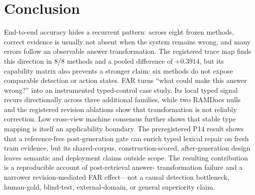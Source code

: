 \documentclass[letterpaper]{article}
\begin{document}
\section{Conclusion}
End-to-end accuracy hides a recurrent pattern: across eight frozen methods,
correct evidence is usually not absent when the system remains wrong, and many
errors follow an observable answer transformation. The registered trace map
finds this direction in 8/8 methods and a pooled difference of $+0.3914$, but
its capability matrix also prevents a stronger claim: six methods do not expose
comparable detection or action states. FAR turns ``what could make this answer
wrong?'' into an instrumented typed-control case study. Its local typed signal
recurs directionally across three additional families, while two RAMDocs nulls
and the registered revision ablations show that transformation is not reliably
correction. Low cross-view machine consensus further shows that stable type
mapping is itself an applicability boundary.
The preregistered P14 result shows that a reference-free post-generation gate
can enrich typed lexical repair on fresh train evidence, but its shared-corpus,
construction-scored, after-generation design leaves semantic and deployment
claims outside scope.
The resulting contribution is a reproducible account of post-retrieval answer-
transformation failure and a narrower revision-mediated FAR effect---not a
causal detection bottleneck, human-gold, blind-test, external-domain, or general
superiority claim.


\end{document}
